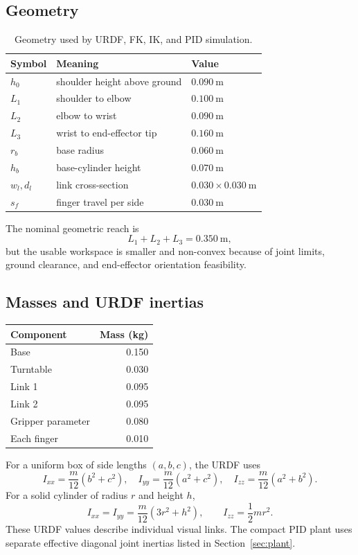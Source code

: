 \documentclass[11pt,a4paper]{article}
\begin{document}
\subsection{Geometry}
\begin{table}[h]
\centering
\caption{Geometry used by URDF, FK, IK, and PID simulation.}
\begin{tabular}{lll}
\toprule
Symbol & Meaning & Value\\
\midrule
$h_0$ & shoulder height above ground & $0.090\ \mathrm{m}$\\
$L_1$ & shoulder to elbow & $0.100\ \mathrm{m}$\\
$L_2$ & elbow to wrist & $0.090\ \mathrm{m}$\\
$L_3$ & wrist to end-effector tip & $0.160\ \mathrm{m}$\\
$r_b$ & base radius & $0.060\ \mathrm{m}$\\
$h_b$ & base-cylinder height & $0.070\ \mathrm{m}$\\
$w_l,d_l$ & link cross-section & $0.030\times0.030\ \mathrm{m}$\\
$s_f$ & finger travel per side & $0.030\ \mathrm{m}$\\
\bottomrule
\end{tabular}
\end{table}
The nominal geometric reach is
\[
  L_1+L_2+L_3=0.350\ \mathrm{m},
\]
but the usable workspace is smaller and non-convex because of joint limits,
ground clearance, and end-effector orientation feasibility.

\subsection{Masses and URDF inertias}
\begin{table}[h]
\centering
\begin{tabular}{lr}
\toprule Component & Mass (kg)\\\midrule
Base & 0.150\\ Turntable & 0.030\\ Link 1 & 0.095\\ Link 2 & 0.095\\
Gripper parameter & 0.080\\ Each finger & 0.010\\\bottomrule
\end{tabular}
\end{table}
For a uniform box of side lengths $(a,b,c)$, the URDF uses
\[
I_{xx}=\frac{m}{12}(b^2+c^2),\quad
I_{yy}=\frac{m}{12}(a^2+c^2),\quad
I_{zz}=\frac{m}{12}(a^2+b^2).
\]
For a solid cylinder of radius $r$ and height $h$,
\[
I_{xx}=I_{yy}=\frac{m}{12}(3r^2+h^2),\qquad
I_{zz}=\frac{1}{2}mr^2.
\]
These URDF values describe individual visual links. The compact PID plant uses
separate effective diagonal joint inertias listed in Section~\ref{sec:plant}.
\end{document}
